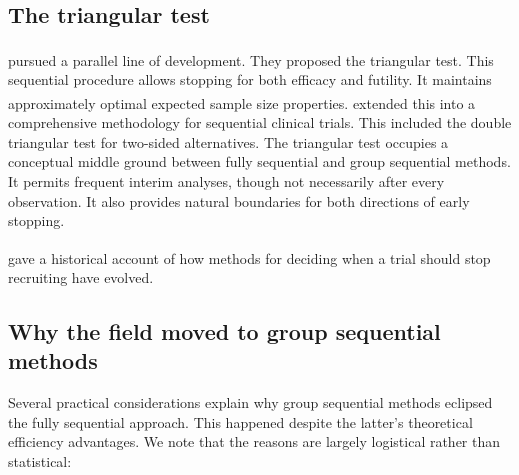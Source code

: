 \documentclass[
  11pt,
]{article}
\begin{document}
\subsection{The triangular test}\label{the-triangular-test}

\textsuperscript{} pursued a parallel line of
development. They proposed the triangular test. This
sequential procedure allows stopping for both efficacy
and futility. It maintains approximately optimal
expected sample size properties.\textsuperscript{}
extended this into a comprehensive methodology for
sequential clinical trials. This included the double
triangular test for two-sided alternatives. The
triangular test occupies a conceptual middle ground
between fully sequential and group sequential methods.
It permits frequent interim analyses, though not
necessarily after every observation. It also provides
natural boundaries for both directions of early
stopping.

\textsuperscript{} gave a historical account of how
methods for deciding when a trial should stop
recruiting have evolved.

\subsection{Why the field moved to group sequential methods}\label{why-the-field-moved-to-group-sequential-methods}

Several practical considerations explain why group
sequential methods eclipsed the fully sequential
approach. This happened despite the latter's
theoretical efficiency advantages. We note that the
reasons are largely logistical rather than statistical:
\end{document}
